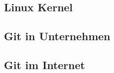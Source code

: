 \chapter{\lookout}
\label{cha:lookout}
\section{Linux Kernel}\label{cha:kernel}
\section{Git in Unternehmen}
\section{Git im Internet}
\chapter{\result}
\label{cha:result}
